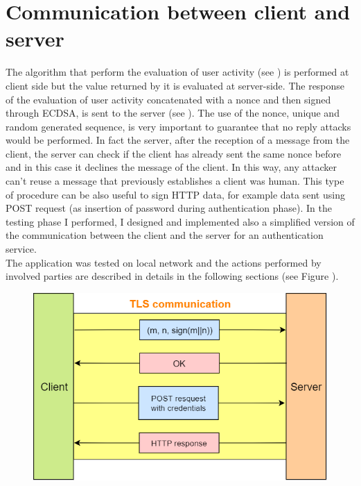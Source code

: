 \section{Communication between client and server}
The algorithm that perform the evaluation of user activity (see ) is performed at client side but the value returned by it is evaluated at server-side. The response of the evaluation of user activity concatenated with a nonce and then signed through ECDSA, is sent to the server (see ). The use of the nonce, unique and random generated sequence, is very important to guarantee that no reply attacks would be performed. In fact the server, after the reception of a message from the client, the server can check if the client has already sent the same nonce before and in this case it declines the message of the client. In this way, any attacker can't reuse a message that previously establishes a client was human. This type of procedure can be also useful to sign HTTP data, for example data sent using POST request (as insertion of password during authentication phase). In the testing phase I performed, I designed and implemented also a simplified version of the communication between the client and the server for an authentication service.\\
The application was tested on local network and the actions performed by involved parties are described in details in the following sections (see Figure ).
\begin{figure}
\centering
\includegraphics[width=.8\textwidth]{Images/AcCAPPCHA/client-server}
\end{figure}
